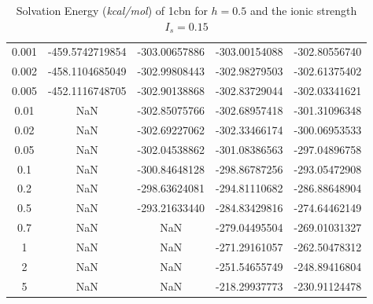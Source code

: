\begin{table}[!ht]
\begin{tabular}{c c c c c }
0.001 & -459.5742719854 & -303.00657886   & -303.00154088   & -302.80556740 \\
0.002 & -458.1104685049 & -302.99808443   & -302.98279503   & -302.61375402 \\
0.005 & -452.1116748705 & -302.90138868   & -302.83729044   & -302.03341621   \\
0.01  &    NaN         & -302.85075766   & -302.68957418   & -301.31096348   \\
0.02  &    NaN         & -302.69227062   & -302.33466174   & -300.06953533   \\
0.05  &    NaN          & -302.04538862   & -301.08386563   & -297.04896758   \\
0.1   &    NaN          & -300.84648128   & -298.86787256   & -293.05472908   \\
0.2   &    NaN           & -298.63624081   & -294.81110682   & -286.88648904   \\
0.5   &    NaN          & -293.21633440   & -284.83429816   & -274.64462149   \\
0.7   &   NaN           & NaN             & -279.04495504   & -269.01031327   \\
1     &     NaN         & NaN             & -271.29161057   & -262.50478312   \\
2     &    NaN          & NaN             & -251.54655749   & -248.89416804   \\
5     &    NaN           & NaN             & -218.29937773   & -230.91124478 \\ \hline
\end{tabular}
\caption{Solvation Energy ({\it kcal/mol}) of 1cbn for $h=0.5$ and the ionic strength $I_s= 0.15$}
\label{tab-1cbn}
\end{table}


